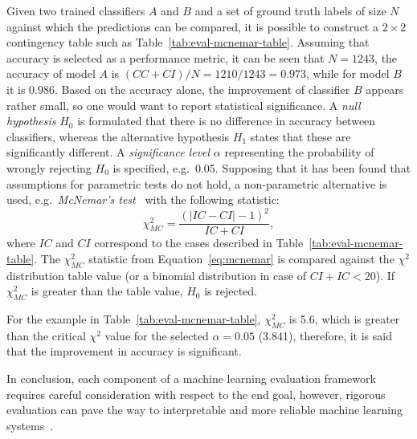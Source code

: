 Given two trained classifiers $A$ and $B$ and a set of ground truth labels of size $N$ against which the predictions can be compared, it is possible to construct a $2\times 2$ contingency table such as Table~\ref{tab:eval-mcnemar-table}.
Assuming that accuracy is selected as a performance metric, it can be seen that $N = 1243$, the accuracy of model $A$ is $(CC + CI) / N = 1210 / 1243 = 0.973$, while for model $B$ it is $0.986$.
Based on the accuracy alone, the improvement of classifier $B$ appears rather small, so one would want to report statistical significance.
A \emph{null hypothesis} $H_0$ is formulated that there is no difference in accuracy between classifiers, whereas the alternative hypothesis $H_1$ states that these are significantly different.
A \emph{significance level} $\alpha$ representing the probability of wrongly rejecting $H_0$ is specified, e.g.\ 0.05.
Supposing that it has been found that assumptions for parametric tests do not hold, a non-parametric alternative is used, e.g.\ \emph{McNemar's test}~\citep{Mcnemar1947} with the following statistic:
\begin{equation}
    \label{eq:mcnemar}
    \chi^2_{MC} = \frac{(\lvert IC - CI  \rvert - 1)^2}{IC + CI},
\end{equation}
where $IC$ and $CI$ correspond to the cases described in Table~\ref{tab:eval-mcnemar-table}.
%
The $\chi^2_{MC}$ statistic from Equation~\ref{eq:mcnemar} is compared against the $\chi^2$ distribution table value (or a binomial distribution in case of $CI + IC < 20$).
If $\chi^2_{MC}$ is greater than the table value, $H_0$ is rejected.

For the example in Table~\ref{tab:eval-mcnemar-table}, $\chi^2_{MC}$ is 5.6, which is greater than the critical $\chi^2$ value for the selected $\alpha=0.05$ (3.841), therefore, it is said that the improvement in accuracy is significant.

In conclusion, each component of a machine learning evaluation framework
requires careful consideration with respect to the end goal, however, rigorous evaluation can pave the way to interpretable and more reliable machine learning systems~\citep{Doshi2017}.

